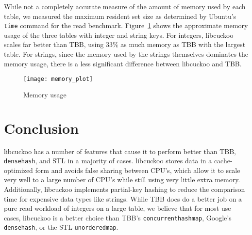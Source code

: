 \documentclass[12pt, letterpaper]{article}
\newcommand{\myfigwidth}{0.9\textwidth}
\newcommand{\tbbmap}{\texttt{concurrent\textunderscore hash\textunderscore map}}
\newcommand{\densehash}{\texttt{dense\textunderscore hash}}
\newcommand{\unorderedmap}{\texttt{unordered\textunderscore map}}
\begin{document}
While not a completely accurate measure of the amount of memory used
by each table, we measured the maximum resident set size as determined
by Ubuntu's \texttt{time} command for the read benchmark.
Figure~\ref{fig:memory} shows the approximate memory usage of the
three tables with integer and string keys. For integers, libcuckoo
scales far better than TBB, using 33\% as much memory as TBB with the
largest table. For strings, since the memory used by the strings
themselves dominates the memory usage, there is a less significant
difference between libcuckoo and TBB.

\begin{figure}
  \centering
  \texttt{[image: memory\_plot]}
  \caption{Memory usage}
  \label{fig:memory}
\end{figure}

\section{Conclusion}
\label{sec:conclusion}

libcuckoo has a number of features that cause it to perform better
than TBB, {\densehash}, and STL in a majority of cases. libcuckoo
stores data in a cache-optimized form and avoids false sharing between
CPU's, which allow it to scale very well to a large number of CPU's
while still using very little extra memory. Additionally, libcuckoo
implements partial-key hashing to reduce the comparison time for
expensive data types like strings. While TBB does do a better job on a
pure read workload of integers on a large table, we believe that for
most use cases, libcuckoo is a better choice than TBB's {\tbbmap},
Google's {\densehash}, or the STL {\unorderedmap}.
\end{document}
